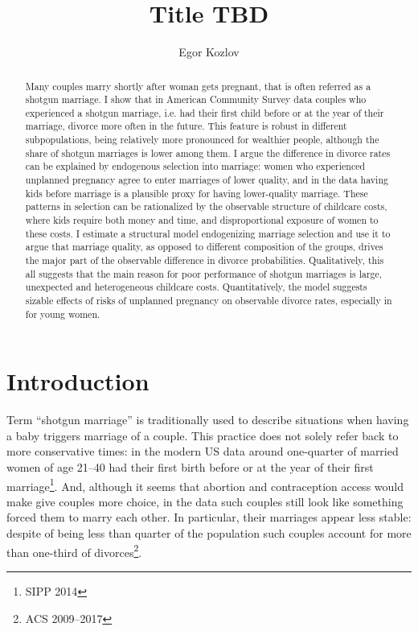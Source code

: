 \documentclass[12pt,letter]{article}
\title{Title TBD}
\author{Egor Kozlov}
\begin{document}
\maketitle

\begin{abstract}
Many couples marry shortly after woman gets pregnant, that is often referred as a shotgun marriage. I show that in American Community Survey data couples who experienced a shotgun marriage, i.e. had their first child before or at the year of their marriage, divorce more often in the future. This feature is robust in different subpopulations, being relatively more pronounced for wealthier people, although the share of shotgun marriages is lower among them. I argue the difference in divorce rates can be explained by endogenous selection into marriage: women who experienced unplanned pregnancy agree to enter marriages of lower quality, and in the data having kids before marriage is a plausible proxy for having lower-quality marriage. These patterns in selection can be rationalized by the observable structure of childcare costs, where kids require both money and time, and disproportional exposure of women to these costs. I estimate a structural model endogenizing marriage selection and use it to argue that marriage quality, as opposed to different composition of the groups, drives the major part of the observable difference in divorce probabilities. Qualitatively, this all suggests that the main reason for poor performance of shotgun marriages is large, unexpected and heterogeneous childcare costs. Quantitatively, the model suggests sizable effects of risks of unplanned pregnancy on observable divorce rates, especially in for young women.
\end{abstract}

\section{Introduction}

Term ``shotgun marriage'' is traditionally used to describe situations when having a baby triggers marriage of a couple. This practice does not solely refer back to more conservative times: in the modern US data  around one-quarter of married women of age 21--40 had their first birth before or at the year of their first marriage\footnote{SIPP 2014}. And, although it seems that abortion and contraception access would make give couples more choice, in the data such couples still look like something forced them to marry each other. In particular, their marriages appear less stable: despite of being less than quarter of the population such couples account for more than one-third of divorces\footnote{ACS 2009--2017}.
\end{document}
